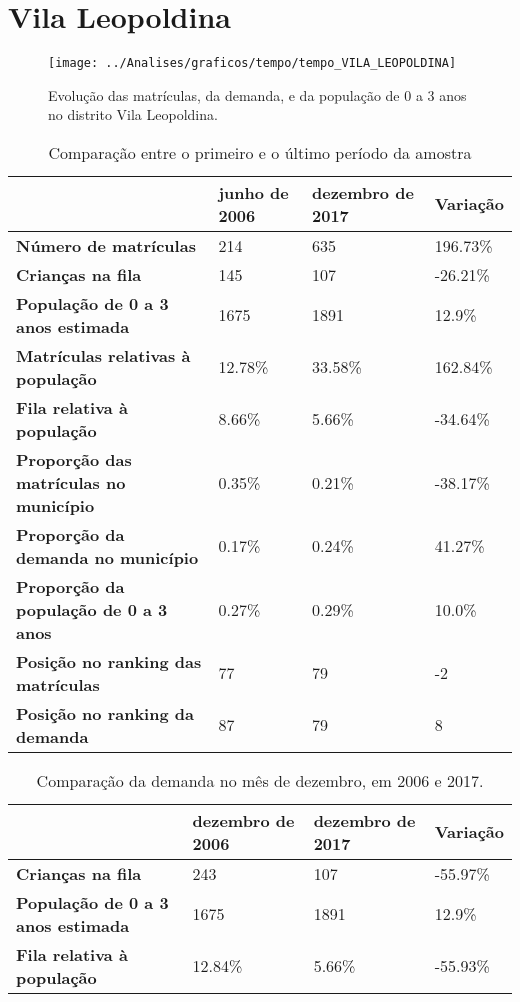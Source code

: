 \section{Vila Leopoldina}
\begin{figure}[H]
\centering
\texttt{[image: ../Analises/graficos/tempo/tempo\_VILA\_LEOPOLDINA]}
\caption{Evolução das matrículas, da demanda, e da população de 0 a 3 anos no distrito Vila Leopoldina.}
\end{figure}
\begin{table}[H]
\begin{tabular}{|l|l|l|l|}
\hline
\textbf{}                                      & \textbf{junho de 2006}       & \textbf{dezembro de 2017}    & \textbf{Variação} \\ \hline
\textbf{Número de matrículas}                  & 214 & 635 & 196.73\% \\ \hline
\textbf{Crianças na fila}                      & 145 & 107 & -26.21\% \\ \hline
\textbf{População de 0 a 3 anos estimada}      & 1675 & 1891 & 12.9\% \\ \hline
\textbf{Matrículas relativas à população}      & 12.78\% & 33.58\% & 162.84\% \\ \hline
\textbf{Fila relativa à população}             & 8.66\% & 5.66\% & -34.64\% \\ \hline
\textbf{Proporção das matrículas no município} & 0.35\% & 0.21\% & -38.17\% \\ \hline
\textbf{Proporção da demanda no município}     & 0.17\% & 0.24\% & 41.27\% \\ \hline
\textbf{Proporção da população de 0 a 3 anos}  & 0.27\% & 0.29\% & 10.0\% \\ \hline
\textbf{Posição no ranking das matrículas}     & 77 & 79 & -2 \\ \hline
\textbf{Posição no ranking da demanda}         & 87 & 79 & 8 \\ \hline
\end{tabular}
\caption{Comparação entre o primeiro e o último período da amostra}
\end{table}
\begin{table}[H]
\begin{tabular}{|l|l|l|l|}
\hline
\textbf{}                                 & \textbf{dezembro de 2006} & \textbf{dezembro de 2017} & \textbf{Variação} \\ \hline
\textbf{Crianças na fila}                      & 243 & 107 & -55.97\% \\ \hline
\textbf{População de 0 a 3 anos estimada}      & 1675 & 1891 & 12.9\% \\ \hline
\textbf{Fila relativa à população}             & 12.84\% & 5.66\% & -55.93\% \\ \hline
\end{tabular}
\caption{Comparação da demanda no mês de dezembro, em 2006 e 2017.}
\end{table}
